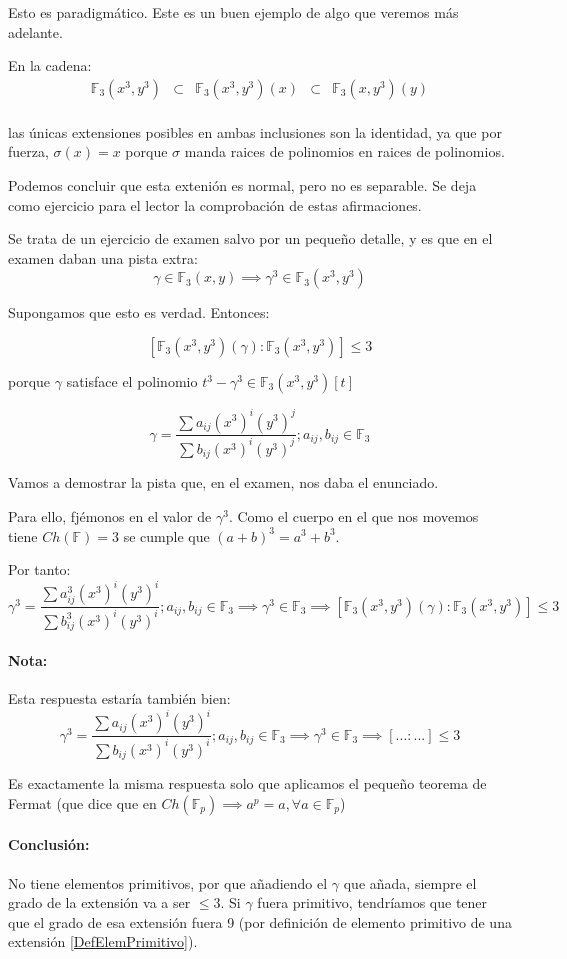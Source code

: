 \begin{problem}[3]
\spart Esto es paradigmático. Este es un buen ejemplo de algo que veremos más adelante.

En la cadena:
$$\begin{array}{ccccc}\mathbb{F}_3(x^3,y^3) &\subset& \mathbb{F}_3(x^3,y^3)(x) &\subset& \mathbb{F}_3(x,y^3)(y)\\
\end{array}$$

las únicas extensiones posibles en ambas inclusiones son la identidad, ya que por fuerza, $σ(x) = x$ porque $σ$ manda raices de polinomios en raices de polinomios.


Podemos concluir que esta extenión es normal, pero no es separable. Se deja como ejercicio para el lector la comprobación de estas afirmaciones.

\spart Se trata de un ejercicio de examen salvo por un pequeño detalle, y es que en el examen daban una pista extra:
\[γ∈\mathbb{F}_3(x,y) \implies γ^3 ∈\mathbb{F}_3(x^3,y^3)\]

Supongamos que esto es verdad. Entonces:

\[[\mathbb{F}_3(x^3,y^3)(γ) : \mathbb{F}_3(x^3,y^3)] ≤ 3\]

porque $γ$ satisface el polinomio $t^3 -γ^3 ∈ \mathbb{F}_3(x^3,y^3)[t]$

\[γ = \frac{\sum a_{ij}(x^3)^i(y^3)^j}{\sum b_{ij}(x^3)^i(y^3)^j}; a_{ij},b_{ij} ∈ \mathbb{F}_3\]

Vamos a demostrar la pista que, en el examen, nos daba el enunciado.

Para ello, fjémonos en el valor de $γ^3$. Como el cuerpo en el que nos movemos tiene $Ch(\mathbb{F}) = 3$ se cumple que $(a+b)^{3} = a^3 + b^3$.

Por tanto:
\[γ^3 = \frac{\sum a_{ij}^3(x^3)^i(y^3)^i}{\sum b_{ij}^3(x^3)^i(y^3)^i}; a_{ij},b_{ij} ∈ \mathbb{F}_3 \implies γ^3 ∈ \mathbb{F}_3 \implies [\mathbb{F}_3(x^3,y^3)(γ) : \mathbb{F}_3(x^3,y^3)] ≤ 3\]

\paragraph{Nota:} Esta respuesta estaría también bien:
$$γ^3 = \frac{\sum a_{ij}(x^3)^i(y^3)^i}{\sum b_{ij}(x^3)^i(y^3)^i}; a_{ij},b_{ij} ∈ \mathbb{F}_3 \implies γ^3 ∈ \mathbb{F}_3 \implies [... : ...] ≤ 3$$

Es exactamente la misma respuesta solo que aplicamos el pequeño teorema de Fermat (que dice que en $Ch(\mathbb{F}_p) \implies a^p = a, ∀a∈\mathbb{F}_p$)


\paragraph{Conclusión:} No tiene elementos primitivos, por que añadiendo el $γ$ que añada, siempre el grado de la extensión va a ser $≤3$. Si $γ$ fuera primitivo, tendríamos que tener que el grado de esa extensión fuera 9 (por definición de elemento primitivo de una extensión \ref{DefElemPrimitivo}).

\end{problem}


